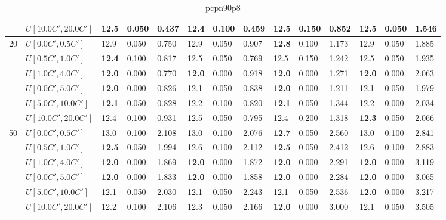 \begin{table}[h]
{\begin{tabular}{|l|l||l|l|l||l|l|l||l|l|l||l|l|l|}
       & $U[10.0C',20.0C']$ & 12.5 & 0.050 & 0.437 & \textbf{12.4} & 0.100 & 0.459 & 12.5 & 0.150 & 0.852 & 12.5 & 0.050 & 1.546 \\
      \hline\hline
      \multirow{6}{*}{20} & $U[0.0C',0.5C']$ & 12.9 & 0.050 & 0.750 & 12.9 & 0.050 & 0.907 & \textbf{12.8} & 0.100 & 1.173 & 12.9 & 0.050 & 1.885 \\
       & $U[0.5C',1.0C']$ & \textbf{12.4} & 0.100 & 0.817 & 12.5 & 0.050 & 0.769 & 12.5 & 0.150 & 1.242 & 12.5 & 0.050 & 1.935 \\
       & $U[1.0C',4.0C']$ & \textbf{12.0} & 0.000 & 0.770 & \textbf{12.0} & 0.000 & 0.918 & \textbf{12.0} & 0.000 & 1.271 & \textbf{12.0} & 0.000 & 2.063 \\
       & $U[0.0C',5.0C']$ & \textbf{12.0} & 0.000 & 0.826 & 12.1 & 0.050 & 0.838 & \textbf{12.0} & 0.000 & 1.211 & 12.1 & 0.050 & 1.979 \\
       & $U[5.0C',10.0C']$ & \textbf{12.1} & 0.050 & 0.828 & 12.2 & 0.100 & 0.820 & \textbf{12.1} & 0.050 & 1.344 & 12.2 & 0.000 & 2.034 \\
       & $U[10.0C',20.0C']$ & 12.4 & 0.100 & 0.931 & 12.5 & 0.050 & 0.795 & 12.4 & 0.200 & 1.318 & \textbf{12.3} & 0.050 & 2.066 \\
      \hline\hline
      \multirow{6}{*}{50} & $U[0.0C',0.5C']$ & 13.0 & 0.100 & 2.108 & 13.0 & 0.100 & 2.076 & \textbf{12.7} & 0.050 & 2.560 & 13.0 & 0.100 & 2.841 \\
       & $U[0.5C',1.0C']$ & \textbf{12.5} & 0.050 & 1.994 & 12.6 & 0.100 & 2.112 & \textbf{12.5} & 0.050 & 2.412 & 12.6 & 0.100 & 2.883 \\
       & $U[1.0C',4.0C']$ & \textbf{12.0} & 0.000 & 1.869 & \textbf{12.0} & 0.000 & 1.872 & \textbf{12.0} & 0.000 & 2.291 & \textbf{12.0} & 0.000 & 3.119 \\
       & $U[0.0C',5.0C']$ & \textbf{12.0} & 0.000 & 1.833 & \textbf{12.0} & 0.000 & 1.858 & \textbf{12.0} & 0.000 & 2.284 & \textbf{12.0} & 0.000 & 3.065 \\
       & $U[5.0C',10.0C']$ & 12.1 & 0.050 & 2.030 & 12.1 & 0.050 & 2.243 & 12.1 & 0.050 & 2.536 & \textbf{12.0} & 0.000 & 3.217 \\
       & $U[10.0C',20.0C']$ & 12.2 & 0.100 & 2.106 & 12.3 & 0.050 & 2.166 & \textbf{12.0} & 0.000 & 3.000 & 12.1 & 0.050 & 3.505 \\
      \hline
      \end{tabular}
      }
      \caption{pcpn90p8}
      \label{tab:pcpn90p8}\end{table}


